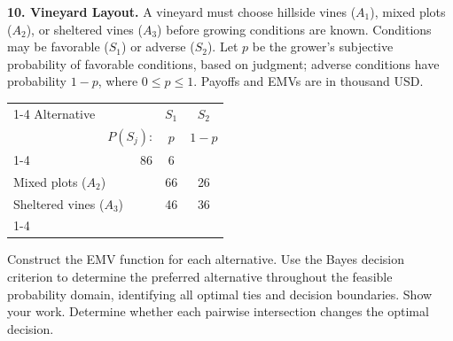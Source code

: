 \noindent\begin{minipage}[t][0.48\textheight][t]{\textwidth}
\textbf{10. Vineyard Layout.} A vineyard must choose hillside vines ($A_1$), mixed plots ($A_2$), or
sheltered vines ($A_3$) before growing conditions are known. Conditions
may be favorable ($S_1$) or adverse ($S_2$). Let $p$ be the grower's
subjective probability of favorable conditions, based on judgment;
adverse conditions have probability $1-p$, where $0\leq p\leq1$.
Payoffs and EMVs are in thousand USD.

\begin{center}
		\renewcommand{\arraystretch}{1.3}
		\small
		\begin{tabular}{lr@{\qquad}cc}
			\cmidrule{1-4}
			Alternative & & $S_1$ & $S_2$ \\
			& $P(S_j)$: & $p$ & $1-p$ \\
			\cmidrule{1-4}
			\multicolumn{2}{l}{Hillside vines ($A_1$)} & 86 & 6 \\
			\multicolumn{2}{l}{Mixed plots ($A_2$)} & 66 & 26 \\
			\multicolumn{2}{l}{Sheltered vines ($A_3$)} & 46 & 36 \\
			\cmidrule{1-4}
		\end{tabular}
	\end{center}

Construct the EMV function for each alternative. Use the Bayes decision criterion to determine the preferred alternative throughout the feasible probability domain, identifying all optimal ties and decision boundaries. Show your work. Determine whether each pairwise intersection changes the optimal decision.
\par\vfill
\end{minipage}\par

\newpage

